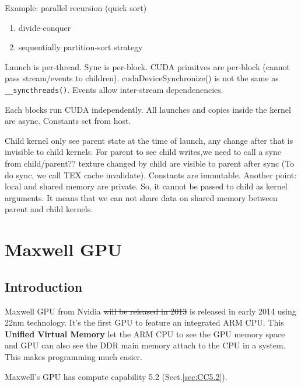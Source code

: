 Example: parallel recursion (quick sort)
\begin{enumerate}
  \item divide-conquer
  \item sequentially partition-sort strategy
\end{enumerate}


Launch is per-thread. Sync is per-block. CUDA primitves are per-block (cannot
pass stream/events to children). cudaDeviceSynchronize() is not the same as
\verb!__syncthreads()!. Events allow inter-stream dependenencies. 


Each blocks run CUDA independently. All launches and copies inside the kernel
are async. Constants set from host. 

Child kernel only see parent state at the time of launch, any change after that
is invisible to child kernels. For parent to see child writes,we need to call a
sync from child/parent?? texture changed by child are visible to parent after
sync (To do sync, we call TEX cache invalidate). Constants are immutable.
Another point: local and shared memory are private. So, it cannot be passed to
child as kernel arguments. It means that we can not share data on shared memory
between parent and child kernels. 






\chapter{Maxwell GPU}
\label{chap:Maxwell_GPUs}

\section{Introduction}
\label{sec:tesla_Maxwell}

Maxwell GPU from Nvidia \sout{will be released in 2013} is released in early
2014 using 22nm technology. It's the first GPU to feature an integrated ARM CPU.
This {\bf Unified Virtual Memory} let the ARM CPU to see the GPU memory space
and GPU can also see the DDR main memory attach to the CPU in a system. This
makes programming much easier. 

Maxwell's GPU has compute capability 5.2 (Sect.\ref{sec:CC5.2}).

